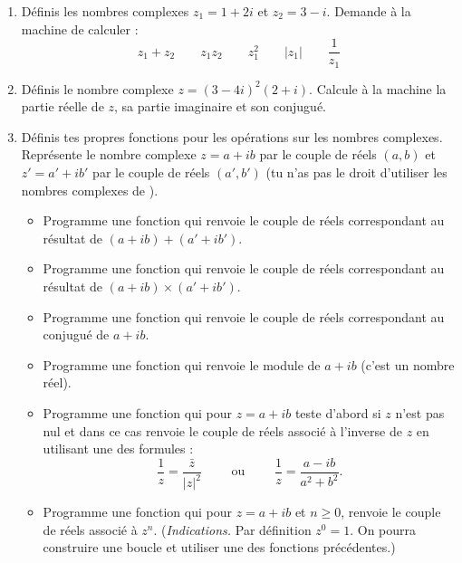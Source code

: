\documentclass[11pt,class=report,crop=false]{standalone}
\begin{document}
\begin{activite}


\begin{enumerate}
  \item Définis les nombres complexes $z_1 = 1+2i$ et $z_2=3-i$.
  Demande à la machine de calculer :
  $$z_1+z_2 \qquad z_1z_2 \qquad z_1^2 \qquad |z_1| \qquad \frac{1}{z_1} $$
    
  \item Définis le nombre complexe $z = (3-4i)^2(2+i)$. 
  Calcule à la machine la partie réelle de $z$, sa partie imaginaire et son conjugué.
  
  \item Définis tes propres fonctions pour les opérations sur les nombres complexes.  Représente le nombre complexe $z=a+i b$ par le couple de réels $(a,b)$ et $z' =a'+i b'$ par le couple de réels $(a',b')$ (tu n'as pas le droit d'utiliser les nombres complexes de \Python).
  
  \begin{itemize}
    \item Programme une fonction  
    qui renvoie le couple de réels correspondant au résultat de $(a+i b) + (a'+i b')$.
    \item Programme une fonction  
    qui renvoie le couple de réels correspondant au résultat de $(a+i b) \times (a'+i b')$.   
    
    \item  Programme une fonction 
    qui renvoie le couple de réels correspondant au conjugué de 
    $a+i b$.
    
    \item  Programme une fonction 
    qui renvoie le module de $a+i b$ (c'est un nombre réel).    
    
    \item  Programme une fonction 
    qui pour $z= a+i b$ teste d'abord si $z$ n'est pas nul et dans ce cas renvoie le couple de réels associé à l'inverse de $z$ en utilisant une des formules :
$$\frac{1}{z} = \frac{\bar z}{|z|^2} \qquad \text{ ou } \qquad \frac{1}{z} = \frac{a-ib}{a^2+b^2}.$$
    
    \item  Programme une fonction 
    qui pour $z= a+i b$ et $n\ge0$, renvoie le couple de réels associé à $z^n$. (\emph{Indications.} Par définition $z^0 = 1$. On pourra construire une boucle et utiliser une des fonctions précédentes.)
    
\end{itemize}    
  
\end{enumerate} 
\end{activite}
\end{document}

